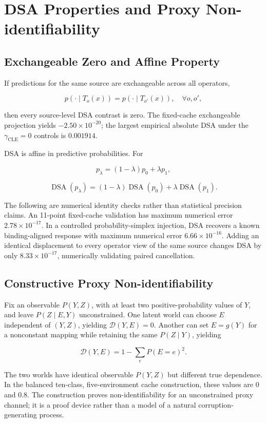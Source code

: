 \appendix
\section{DSA Properties and Proxy Non-identifiability}

\subsection{Exchangeable Zero and Affine Property}

If predictions for the same source are exchangeable across all operators,

\[
p(\cdot\mid T_o(x))=p(\cdot\mid T_{o'}(x)),\quad\forall o,o',
\]

then every source-level DSA contrast is zero. The fixed-cache exchangeable projection yields \(-2.50\times10^{-20}\); the largest empirical absolute DSA under the \(\gamma_{\mathrm{CLE}}=0\) controls is \(0.001914\).

DSA is affine in predictive probabilities. For

\[
p_\lambda=(1-\lambda)p_0+\lambda p_1,
\]

\[
\operatorname{DSA}(p_\lambda)
=(1-\lambda)\operatorname{DSA}(p_0)
+\lambda\operatorname{DSA}(p_1).
\]

The following are numerical identity checks rather than statistical precision claims. An 11-point fixed-cache validation has maximum numerical error \(2.78\times10^{-17}\). In a controlled probability-simplex injection, DSA recovers a known binding-aligned response with maximum numerical error \(6.66\times10^{-16}\). Adding an identical displacement to every operator view of the same source changes DSA by only \(8.33\times10^{-17}\), numerically validating paired cancellation.

\subsection{Constructive Proxy Non-identifiability}

Fix an observable \(P(Y,Z)\), with at least two positive-probability values of \(Y\), and leave \(P(Z\mid E,Y)\) unconstrained. One latent world can choose \(E\) independent of \((Y,Z)\), yielding \(\mathcal D(Y,E)=0\). Another can set \(E=g(Y)\) for a nonconstant mapping while retaining the same \(P(Z\mid Y)\), yielding

\[
\mathcal D(Y,E)=1-\sum_eP(E=e)^2.
\]

The two worlds have identical observable \(P(Y,Z)\) but different true dependence. In the balanced ten-class, five-environment cache construction, these values are 0 and 0.8. The construction proves non-identifiability for an unconstrained proxy channel; it is a proof device rather than a model of a natural corruption-generating process.

